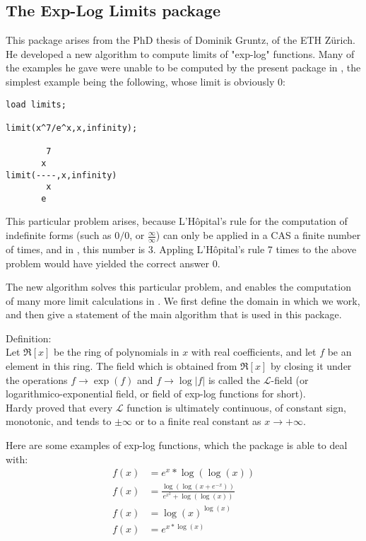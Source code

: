 

\subsection{The Exp-Log Limits package}

This package arises from the PhD thesis of Dominik
Gruntz\cite{Gruntz:96}, of the ETH Z\"{u}rich. He developed a new
algorithm to compute limits of "exp-log" functions. Many of the
examples he gave were unable to be computed by the present
 package in \REDUCE, the simplest example being the
following, whose limit is obviously $0$:
\begin{verbatim}
load limits;

limit(x^7/e^x,x,infinity);

        7
       x
limit(----,x,infinity)
        x
       e
\end{verbatim}
This particular problem arises, because L'H\^{o}pital's rule for the
computation of indefinite forms (such as $0/0$, or
$\frac{\infty}{\infty}$) can only be applied in a CAS a finite number
of times, and in \REDUCE, this number is 3. Appling L'H\^{o}pital's rule 7 times to the
above problem would have yielded the correct answer 0.

The new algorithm solves this particular problem, and enables the
computation of many more limit calculations in \REDUCE. We first
define the domain in which we work, and then give a statement of the
main algorithm that is used in this package.

\noindent Definition: \\
Let $\Re[x]$ be the ring of polynomials in $x$ with real coefficients,
and let $f$ be an element in this ring. The field which is obtained
from $\Re[x]$ by closing it under the operations $f\rightarrow\exp(f)$
and $f\rightarrow\log |f|$ is called the $\mathcal{L}$-field (or
logarithmico-exponential field, or field of exp-log functions for
short).
\\[\baselineskip]
Hardy proved \cite{Hardy:1912} that every $\mathcal{L}$ function is ultimately continuous, of
constant sign, monotonic, and tends to $\pm \infty$ or to a finite
real constant as $x\rightarrow +\infty.$

Here are some examples of exp-log functions, which the package is able to deal with:
\begin{align*}
 f(x) &=e^{x}*\log(\log(x)) \\[2mm]
 f(x) &=\frac{\log(\log(x+e^{-x}))}{e^{x^{2}}+\log(\log(x))}  \\[2mm]
 f(x) &=\log(x)^{\log(x)}  \\[2mm]
 f(x) &=e^{x*\log(x)}
\end{align*}

